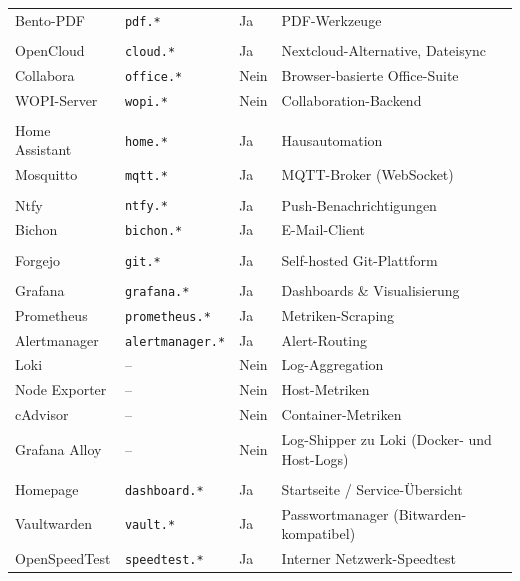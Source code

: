 \begin{xltabular}{\linewidth}{@{} >{\leavevmode}p{3.2cm} p{3.5cm} p{1.3cm} >{\RaggedRight\arraybackslash\leavevmode}X @{}}
  Bento-PDF       & \texttt{pdf.*}          & Ja & PDF-Werkzeuge \\
  \pagebreak
   \\
  OpenCloud       & \texttt{cloud.*}        & Ja   & Nextcloud-Alternative, Dateisync \\
  Collabora       & \texttt{office.*}       & Nein & Browser-basierte Office-Suite \\
  \acs{WOPI}-Server     & \texttt{wopi.*}         & Nein & Collaboration-Backend \\
  \midrule
   \\
  Home Assistant  & \texttt{home.*}         & Ja & Hausautomation \\
  Mosquitto       & \texttt{mqtt.*}         & Ja & \acs{MQTT}-Broker (WebSocket) \\
  \midrule
   \\
  Ntfy            & \texttt{ntfy.*}         & Ja & Push-Benachrichtigungen \\
  Bichon          & \texttt{bichon.*}       & Ja & E-Mail-Client \\
  \midrule
   \\
  Forgejo         & \texttt{git.*}          & Ja & Self-hosted Git-Plattform \\
  \midrule
   \\
  Grafana         & \texttt{grafana.*}      & Ja   & Dashboards \& Visualisierung \\
  Prometheus      & \texttt{prometheus.*}   & Ja   & Metriken-Scraping \\
  Alertmanager    & \texttt{alertmanager.*} & Ja   & Alert-Routing \\
  Loki            & --                      & Nein & Log-Aggregation \\
  Node Exporter   & --                      & Nein & Host-Metriken \\
  cAdvisor        & --                      & Nein & Container-Metriken \\
  Grafana Alloy   & --                      & Nein & Log-Shipper zu Loki (Docker- und Host-Logs) \\
   \\
  Homepage        & \texttt{dashboard.*}    & Ja & Startseite / Service-Übersicht \\
  Vaultwarden     & \texttt{vault.*}        & Ja & Passwortmanager (Bitwarden-kompatibel) \\
  OpenSpeedTest   & \texttt{speedtest.*}    & Ja & Interner Netzwerk-Speedtest \\
\end{xltabular}